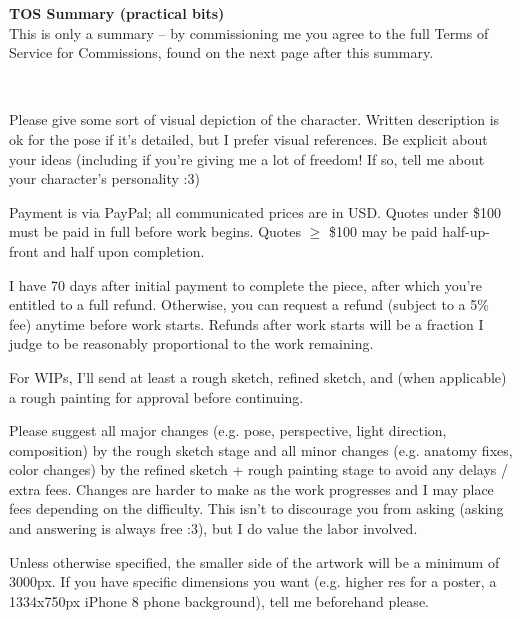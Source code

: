 \documentclass{article}
\newcommand{\hsp}[1][5]{\hspace{0.#1 cm}}
\newcommand{\hcm}[1][1]{\hspace{#1 cm}}
\begin{document}
\begin{center}
	\parbox{12cm}{
		\begin{center}
			\textbf{\large TOS Summary (practical bits)}\\[12pt]

			This is only a summary -- by commissioning me you agree to the full Terms of Service for Commissions, found on the next page after this summary.
		\end{center}
	}
\end{center}

\begin{flushleft}
\hcm\\

\begin{center}
	\parbox{14cm}{
		Please give some sort of visual depiction of the character. Written description is ok for the pose if it's detailed, but I prefer visual references. Be explicit about your ideas (including if you're giving me a lot of freedom! If so, tell me about your character's personality :3)\\\hcm

		Payment is via PayPal; all communicated prices are in USD. Quotes under \$100 must be paid in full before work begins. Quotes $\geq$ \$100 may be paid half-up-front and half upon completion.\\\hcm

		I have 70 days after initial payment to complete the piece, after which you're entitled to a full refund. Otherwise, you can request a refund (subject to a 5\% fee) anytime before work starts. Refunds after work starts will be a fraction I judge to be reasonably proportional to the work remaining.\\\hsp

		For WIPs, I'll send at least a rough sketch, refined sketch, and (when applicable) a rough painting for approval before continuing.\\\hcm

		Please suggest all major changes (e.g. pose, perspective, light direction, composition) by the rough sketch stage and all minor changes (e.g. anatomy fixes, color changes) by the refined sketch + rough painting stage to avoid any delays / extra fees. Changes are harder to make as the work progresses and I may place fees depending on the difficulty. This isn't to discourage you from asking (asking and answering is always free :3), but I do value the labor involved.\\\hcm

		Unless otherwise specified, the smaller side of the artwork will be a minimum of 3000px. If you have specific dimensions you want (e.g. higher res for a poster, a 1334x750px iPhone 8 phone background), tell me beforehand please.\\\hcm

}
\end{center}
\end{flushleft}
\end{document}
